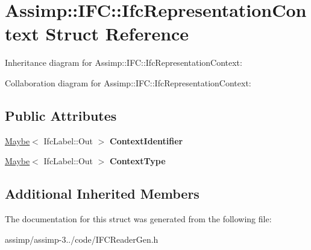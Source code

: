 \hypertarget{struct_assimp_1_1_i_f_c_1_1_ifc_representation_context}{\section{Assimp\+:\+:I\+F\+C\+:\+:Ifc\+Representation\+Context Struct Reference}
\label{struct_assimp_1_1_i_f_c_1_1_ifc_representation_context}
}


Inheritance diagram for Assimp\+:\+:I\+F\+C\+:\+:Ifc\+Representation\+Context\+:


Collaboration diagram for Assimp\+:\+:I\+F\+C\+:\+:Ifc\+Representation\+Context\+:
\subsection*{Public Attributes}
\begin{DoxyCompactItemize}
\item 
\hypertarget{struct_assimp_1_1_i_f_c_1_1_ifc_representation_context_ac9eb7be9c2ad476677aa456e8dcce79b}{\hyperlink{struct_assimp_1_1_s_t_e_p_1_1_maybe}{Maybe}$<$ Ifc\+Label\+::\+Out $>$ {\bfseries Context\+Identifier}}\label{struct_assimp_1_1_i_f_c_1_1_ifc_representation_context_ac9eb7be9c2ad476677aa456e8dcce79b}

\item 
\hypertarget{struct_assimp_1_1_i_f_c_1_1_ifc_representation_context_ad81ea92ec92a0667c73273f4875acaa4}{\hyperlink{struct_assimp_1_1_s_t_e_p_1_1_maybe}{Maybe}$<$ Ifc\+Label\+::\+Out $>$ {\bfseries Context\+Type}}\label{struct_assimp_1_1_i_f_c_1_1_ifc_representation_context_ad81ea92ec92a0667c73273f4875acaa4}

\end{DoxyCompactItemize}
\subsection*{Additional Inherited Members}


The documentation for this struct was generated from the following file\+:\begin{DoxyCompactItemize}
\item 
assimp/assimp-\/3../code/I\+F\+C\+Reader\+Gen.\+h\end{DoxyCompactItemize}
